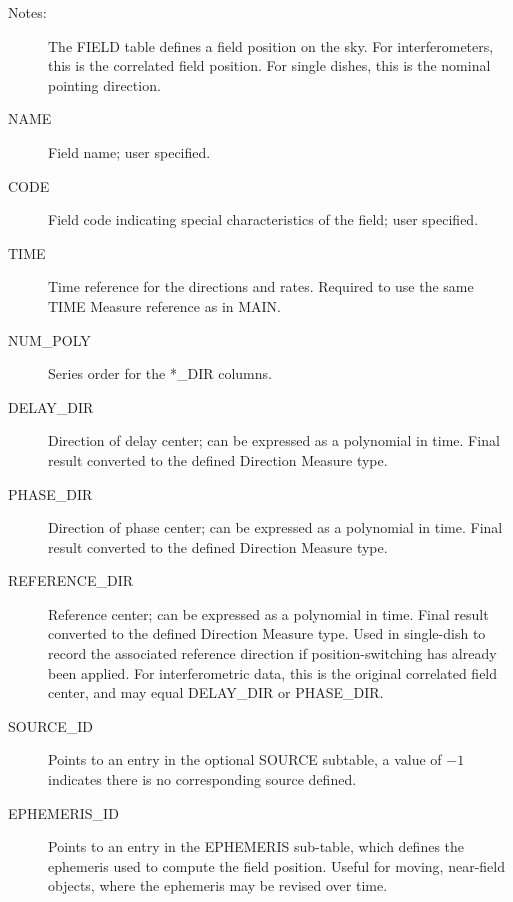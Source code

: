 \documentclass{article}
\begin{document}
\begin{description}

\item[Notes:] The FIELD table defines a field position on the sky. For
interferometers, this is the correlated field position. For single dishes,
this is the nominal pointing direction.

\item[NAME] Field name; user specified.

\item[CODE] Field code indicating special characteristics of the
field; user specified.

\item[TIME] Time reference for the directions and rates. Required to 
use the same TIME Measure reference as in MAIN.

\item[NUM\_POLY] Series order for the *\_DIR columns.

\item[DELAY\_DIR] Direction of delay center; can be expressed as a
polynomial in time. Final result converted to the defined Direction
Measure type.

\item[PHASE\_DIR] Direction of phase center; can be expressed as a
polynomial in time. Final result converted to the defined Direction
Measure type.

\item[REFERENCE\_DIR] Reference center; can be expressed as a
polynomial in time. Final result converted to the defined Direction
Measure type. Used in single-dish to record the associated reference
direction if position-switching has already been applied. For
interferometric data, this is the original correlated field center,
and may equal DELAY\_DIR or PHASE\_DIR.

\item[SOURCE\_ID] Points to an entry in the optional SOURCE subtable, a
value of $-1$ indicates there is no corresponding source defined.

\item[EPHEMERIS\_ID] Points to an entry in the EPHEMERIS sub-table,
which defines the ephemeris used to compute the field position. Useful
for moving, near-field objects, where the ephemeris may be revised over time.

\end{description}
\end{document}
